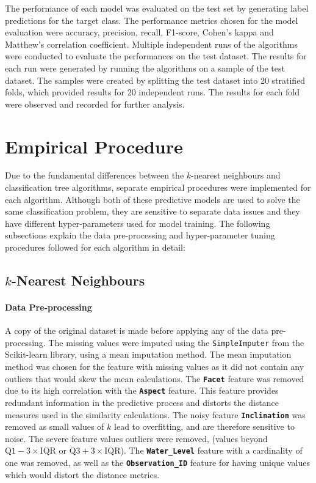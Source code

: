 \documentclass[conference]{IEEEtran}
\begin{document}
	
	The performance of each model was evaluated on the test set by generating label predictions for the target class. The performance metrics chosen for the model evaluation were accuracy, precision, recall, F1-score, Cohen's kappa and Matthew's correlation coefficient. Multiple independent runs of the algorithms were conducted to evaluate the performances on the test dataset. The results for each run were generated by running the algorithms on a sample of the test dataset. The samples were created by splitting the test dataset into 20 stratified folds, which provided results for 20 independent runs. The results for each fold were observed and recorded for further analysis.
	
	\section{Empirical Procedure}\label{EP}
	Due to the fundamental differences between the $k$-nearest neighbours and classification tree algorithms, separate empirical procedures were implemented for each algorithm. Although both of these predictive models are used to solve the same classification problem, they are sensitive to separate data issues and they have different hyper-parameters used for model training. The following subsections explain the data pre-processing and hyper-parameter tuning procedures followed for each algorithm in detail:
	
	\subsection{$k$-Nearest Neighbours}
	\paragraph{Data Pre-processing}
	A copy of the original dataset is made before applying any of the data pre-processing. The missing values were imputed using the \texttt{SimpleImputer} from the Scikit-learn library, using a mean imputation method. The mean imputation method was chosen for the feature with missing values as it did not contain any outliers that would skew the mean calculations. The \texttt{\textbf{Facet}} feature was removed due to its high correlation with the \texttt{\textbf{Aspect}} feature. This feature provides redundant information in the predictive process and distorts the distance measures used in the similarity calculations. The noisy feature \texttt{\textbf{Inclination}} was removed as small values of $k$ lead to overfitting, and are therefore sensitive to noise. The severe feature values outliers were removed, (values beyond $\text{Q1} - 3\times\text{IQR}$ or $\text{Q3} + 3\times\text{IQR}$). The \texttt{\textbf{Water\_Level}} feature with a cardinality of one was removed, as well as the \texttt{\textbf{Observation\_ID}} feature for having unique values which would distort the distance metrics. 
	
\end{document}
